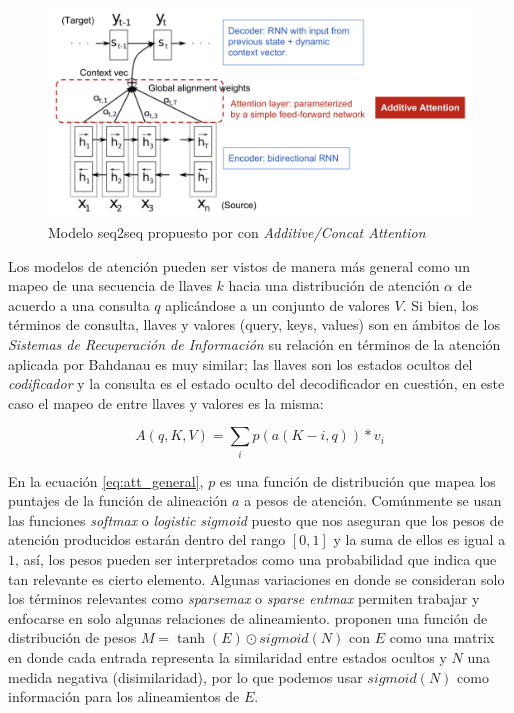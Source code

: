 \begin{figure}[ht!]
    \centering
    \includegraphics[width=0.8 \textwidth]{Chapters/1. Transformer/Figures/rnn/attention.png}
    \caption{Modelo seq2seq propuesto por \citeauthor{bahdanau2016neural} con \textit{Additive/Concat Attention}}
    \label{fig:att}
\end{figure}

Los modelos de atención pueden ser vistos de manera más general como un mapeo de una secuencia de
llaves $k$ hacia una distribución de atención $\alpha$ de acuerdo a una consulta $q$ aplicándose a un
conjunto de valores $V$. Si bien, los términos de consulta, llaves y valores (query, keys, values)
son en ámbitos de los \textit{Sistemas de Recuperación de Información} su relación en términos de
la atención aplicada por Bahdanau es muy similar; las llaves son los estados ocultos del \textit{codificador}
y la consulta es el estado oculto del decodificador en cuestión, en este caso el mapeo de entre llaves
y valores es la misma:

\begin{equation}
    A(q, K, V) = \sum_i p(a(K-i, q)) * v_i
    \label{eq:att_general}
\end{equation}

En la ecuación \ref{eq:att_general}, $p$ es una función de distribución que mapea los puntajes de la
función de alineación $a$ a pesos de atención. Comúnmente se usan las funciones \textit{softmax} o
\textit{logistic sigmoid} puesto que nos aseguran que los pesos de atención producidos estarán dentro
del rango $[0,1]$ y la suma de ellos es igual a $1$, así, los pesos pueden ser interpretados como
una probabilidad que indica que tan relevante es cierto elemento. Algunas variaciones en donde se
consideran solo los términos relevantes como \textit{sparsemax} \citeauthor{DBLP:journals/corr/MartinsA16}
o \textit{sparse entmax} \citeauthor{DBLP:journals/corr/abs-2006-07214} permiten trabajar y enfocarse
en solo algunas relaciones de alineamiento. \citeauthor{NEURIPS2019_16fc18d7} proponen una función de
distribución de pesos $M = \tanh(E) \odot sigmoid(N)$ con $E$ como una matrix en donde cada entrada
representa la similaridad entre estados ocultos y $N$ una medida negativa (disimilaridad), por lo que
podemos usar
$sigmoid(N)$ como información para  los alineamientos de $E$.


